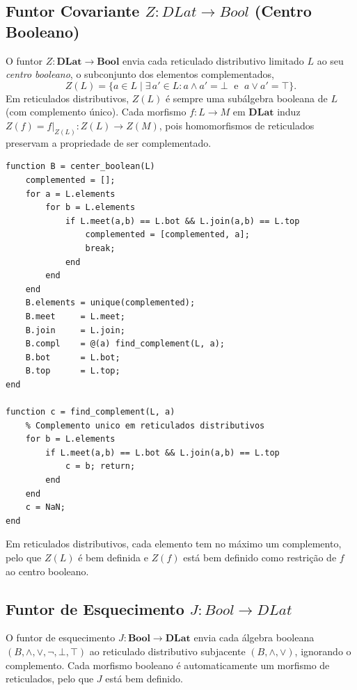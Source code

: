 \subsection{Funtor Covariante \texorpdfstring{$Z: DLat \to Bool$}{Z: DLat -> Bool} (Centro Booleano)}

O funtor $Z: \mathbf{DLat} \to \mathbf{Bool}$ envia cada reticulado distributivo limitado $L$ ao seu \emph{centro booleano}, o subconjunto dos elementos complementados,
\[
    Z(L) = \bigl\{a \in L \;\big|\; \exists\, a' \in L : a \wedge a' = \bot \;\text{ e }\; a \vee a' = \top\bigr\}.
\]
Em reticulados distributivos, $Z(L)$ é sempre uma subálgebra booleana de $L$ (com complemento único). Cada morfismo $f: L \to M$ em $\mathbf{DLat}$ induz $Z(f) = f|_{Z(L)}: Z(L) \to Z(M)$, pois homomorfismos de reticulados preservam a propriedade de ser complementado.

\begin{lstlisting}[style=matlab, caption={Funtor $Z$ --- extração do centro booleano de um reticulado distributivo}]
function B = center_boolean(L)
    complemented = [];
    for a = L.elements
        for b = L.elements
            if L.meet(a,b) == L.bot && L.join(a,b) == L.top
                complemented = [complemented, a];
                break;
            end
        end
    end
    B.elements = unique(complemented);
    B.meet     = L.meet;
    B.join     = L.join;
    B.compl    = @(a) find_complement(L, a);
    B.bot      = L.bot;
    B.top      = L.top;
end

function c = find_complement(L, a)
    % Complemento unico em reticulados distributivos
    for b = L.elements
        if L.meet(a,b) == L.bot && L.join(a,b) == L.top
            c = b; return;
        end
    end
    c = NaN;
end
\end{lstlisting}

\begin{remark}
Em reticulados distributivos, cada elemento tem no máximo um complemento, pelo que $Z(L)$ é bem definida e $Z(f)$ está bem definido como restrição de $f$ ao centro booleano.
\end{remark}

\subsection{Funtor de Esquecimento \texorpdfstring{$J: Bool \to DLat$}{J: Bool -> DLat}}

O funtor de esquecimento $J: \mathbf{Bool} \to \mathbf{DLat}$ envia cada álgebra booleana $(B, \wedge, \vee, \neg, \bot, \top)$ ao reticulado distributivo subjacente $(B, \wedge, \vee)$, ignorando o complemento. Cada morfismo booleano é automaticamente um morfismo de reticulados, pelo que $J$ está bem definido.

